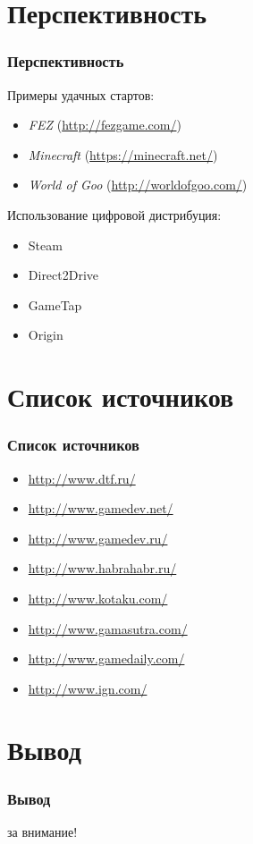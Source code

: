 \section{Перспективность}
\begin{frame}
    \frametitle{Перспективность}
    Примеры удачных стартов:
    \begin{itemize}
        \item \emph{FEZ} (\url{http://fezgame.com/})
        \item \emph{Minecraft} (\url{https://minecraft.net/})
        \item \emph{World of Goo} (\url{http://worldofgoo.com/})
    \end{itemize}
    Использование цифровой дистрибуция:
    \begin{itemize}
        \item Steam
        \item Direct2Drive
        \item GameTap
        \item Origin
    \end{itemize}
\end{frame}

\section{Список источников}
\begin{frame}
    \frametitle{Список источников}
    \begin{itemize}
        \item \url{http://www.dtf.ru/}
        \item \url{http://www.gamedev.net/}
        \item \url{http://www.gamedev.ru/}
        \item \url{http://www.habrahabr.ru/}
        \item \url{http://www.kotaku.com/}
        \item \url{http://www.gamasutra.com/}
        \item \url{http://www.gamedaily.com/}
        \item \url{http://www.ign.com/}
    \end{itemize}
\end{frame}

\section{Вывод}
\begin{frame}
    \frametitle{Вывод}
\end{frame}

\begin{frame}
    \Huge{} за внимание!
\end{frame}